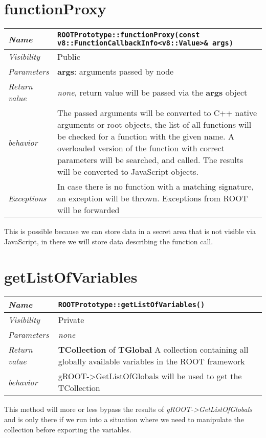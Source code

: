 \section{functionProxy}
\begin{longtable}{p{3cm} @{\hskip 1cm} p{12cm}}
  \hline
  \textit{Name} & \texttt{ROOTPrototype::functionProxy(const v8::FunctionCallbackInfo<v8::Value>\& args)} \\
  \hline
  \textit{Visibility} & Public \\
  \hline
  \textit{Parameters} & \textbf{args}: arguments passed by node \\
  \hline
  \textit{Return value} & \textit{none}, return value will be passed via the \textbf{args} object \\
  \hline
  \textit{behavior} & The passed arguments will be converted to C++ native arguments or root objects, the list of all functions will be checked for a function with the given name.
  A overloaded version of the function with correct parameters will be searched, and called. The results will be converted to JavaScript objects. \\
  \hline
  \textit{Exceptions} & In case there is no function with a matching signature, an exception will be thrown.
  Exceptions from ROOT will be forwarded
  \hline
\end{longtable}
This is possible because we can store data in a secret area that is not visible via JavaScript, in there we will store data describing the function call.
\newpage
\section{getListOfVariables}
\begin{longtable}{p{3cm} @{\hskip 1cm} p{12cm}}
  \hline
  \textit{Name} & \texttt{ROOTPrototype::getListOfVariables()} \\
  \hline
  \textit{Visibility} & Private \\
  \hline
  \textit{Parameters} & \textit{none} \\
  \hline
  \textit{Return value} & \textbf{TCollection} of \textbf{TGlobal} A collection containing all globally available variables in the ROOT framework \\
  \hline
  \textit{behavior} & gROOT->GetListOfGlobals will be used to get the TCollection \\
  \hline
\end{longtable}
This method will more or less bypass the results of \textit{gROOT->GetListOfGlobals} and is only there if we run into a situation where we need to manipulate the collection before exporting the variables.
\newpage
